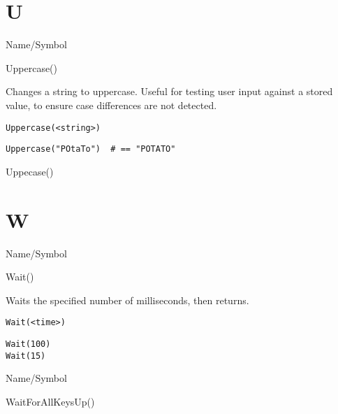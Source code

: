 \rl
\section{U}
\rl


\begin{desc}{Name/Symbol}
\item[Name/Symbol]  	Uppercase()

\item[Description]  	Changes a string to uppercase.  Useful for testing user
	      	input against a stored value, to ensure case differences
	      	are not detected.

\item[Usage]
\begin{verbatim}
Uppercase(<string>)
\end{verbatim}

\item[Example]     
\begin{verbatim}
Uppercase("POtaTo")  # == "POTATO"
\end{verbatim}

\item[See Also]     	Uppecase()
\end{desc}

\rl
\section{W}
\rl


\begin{desc}{Name/Symbol}
\item[Name/Symbol]  	Wait() 

\item[Description] 	Waits the specified number of milliseconds, then returns. 

\item[Usage]
\begin{verbatim}
Wait(<time>)
\end{verbatim}

\item[Example]
\begin{verbatim}
Wait(100)
Wait(15)
\end{verbatim}

\item[See Also]	
\end{desc}

\rl


\begin{desc}{Name/Symbol}
\item[Name/Symbol]  	WaitForAllKeysUp()

\item[Description]	

\item[Usage]		

\item[Example]	

\item[See Also]	
\end{desc}

